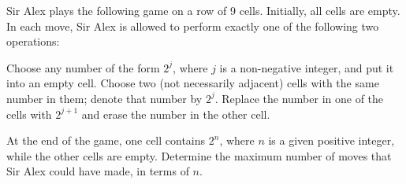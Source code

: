 Sir Alex plays the following game on a row of 9 cells. Initially, all cells are empty. In each move, Sir Alex is allowed to perform exactly one of the following two operations:


Choose any number of the form 
$2^j$,
 where 
$j$
 is a non-negative integer, and put it into an empty cell.
Choose two (not necessarily adjacent) cells with the same number in them; denote that number by 
$2^j$.
 Replace the number in one of the cells with 
$2^{j+1}$
 and erase the number in the other cell.


At the end of the game, one cell contains 
$2^n$,
 where 
$n$
 is a given positive integer, while the other cells are empty. Determine the maximum number of moves that Sir Alex could have made, in terms of 
$n$.
